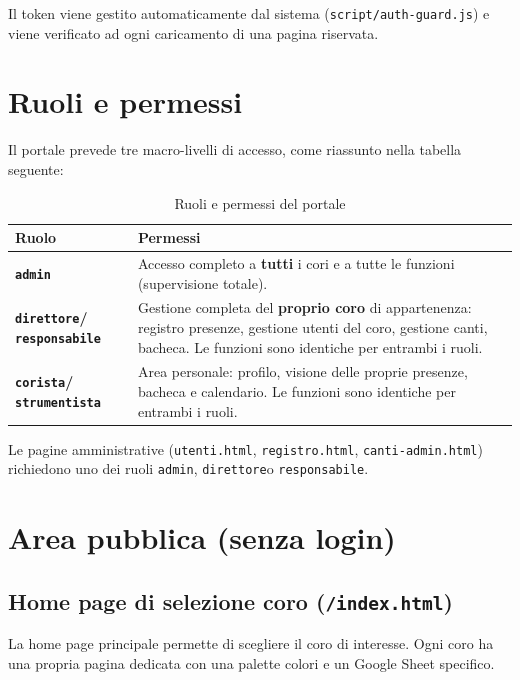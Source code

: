 \documentclass[a4paper,12pt]{article}
\newcommand{\roleadmin}{\texttt{admin}}
\newcommand{\roledirettore}{\texttt{direttore}}
\newcommand{\roleresponsabile}{\texttt{responsabile}}
\newcommand{\rolecorista}{\texttt{corista}}
\newcommand{\rolestrumentista}{\texttt{strumentista}}
\begin{document}
	\begin{important}
		Il token viene gestito automaticamente dal sistema (\texttt{script/auth-guard.js}) e viene verificato ad ogni caricamento di una pagina riservata.
	\end{important}
	
	\section{Ruoli e permessi}
	
	Il portale prevede tre macro-livelli di accesso, come riassunto nella tabella seguente:
	
	\begin{table}[h]
		\centering
		\begin{tabular}{>{\bfseries}l p{10cm}}
			\toprule
			Ruolo & Permessi \\
			\midrule
			\roleadmin & Accesso completo a \textbf{tutti} i cori e a tutte le funzioni (supervisione totale). \\
			\roledirettore / \roleresponsabile & Gestione completa del \textbf{proprio coro} di appartenenza: registro presenze, gestione utenti del coro, gestione canti, bacheca. Le funzioni sono identiche per entrambi i ruoli. \\
			\rolecorista / \rolestrumentista & Area personale: profilo, visione delle proprie presenze, bacheca e calendario. Le funzioni sono identiche per entrambi i ruoli. \\
			\bottomrule
		\end{tabular}
		\caption{Ruoli e permessi del portale}
		\label{tab:ruoli}
	\end{table}
	
	Le pagine amministrative (\texttt{utenti.html}, \texttt{registro.html}, \texttt{canti-admin.html}) richiedono uno dei ruoli \roleadmin, \roledirettore o \roleresponsabile.
	
	\section{Area pubblica (senza login)}
	
	\subsection{Home page di selezione coro (\texttt{/index.html})}
	
	La home page principale permette di scegliere il coro di interesse. Ogni coro ha una propria pagina dedicata con una palette colori e un Google Sheet specifico.
	
\end{document}
